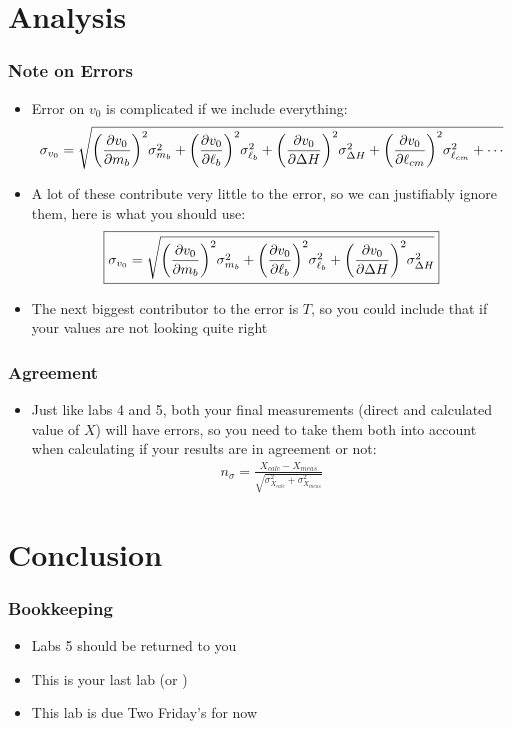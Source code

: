 \documentclass[aspectratio=169]{beamer}
\begin{document}
\section{Analysis}
\begin{frame}
  \frametitle{Note on Errors}
  \begin{itemize}
  \item Error on $v_0$ is complicated if we include everything:
    \begin{align*}
      \sigma_{v_0}=\sqrt{\qty(\pdv{v_0}{m_b})^2\sigma_{m_b}^2
        +\qty(\pdv{v_0}{\ell_b})^2\sigma_{\ell_b}^2
        +\qty(\pdv{v_0}{\Delta H})^2\sigma_{\Delta H}^2
        +\qty(\pdv{v_0}{\ell_{cm}})^2\sigma_{\ell_{cm}}^2
        +\cdots}
    \end{align*}
  \item A lot of these contribute very little to the error, so we can justifiably ignore them, here is what you should use:
    \begin{align*}
      \boxed{\sigma_{v_0}=\sqrt{\qty(\pdv{v_0}{m_b})^2\sigma_{m_b}^2
        +\qty(\pdv{v_0}{\ell_b})^2\sigma_{\ell_b}^2
        +\qty(\pdv{v_0}{\Delta H})^2\sigma_{\Delta H}^2}}
    \end{align*}
  \item The next biggest contributor to the error is $T$, so you could include that if your values are not looking quite right
  \end{itemize}
\end{frame}

\begin{frame}
  \frametitle{Agreement}
  \begin{itemize}
  \item Just like labs 4 and 5, both your final measurements (direct and calculated value of $X$) will have errors, so you need to take them both into account when calculating if your results are in agreement or not:
    \begin{align*}
      \boxed{n_\sigma=\frac{X_{calc}-X_{meas}}
      {\sqrt{\sigma^2_{X_{calc}}+\sigma^2_{X_{meas}}}}}
    \end{align*}
  \end{itemize}
\end{frame}

\section{Conclusion}

\begin{frame}
  \frametitle{Bookkeeping}
  \begin{itemize}
  \item Labs 5 should be returned to you
  \item This is your last lab {\Large\frownie} (or {\Large\smiley})
  \item This lab is due Two Friday's for now
  \end{itemize}
\end{frame}
\end{document}
